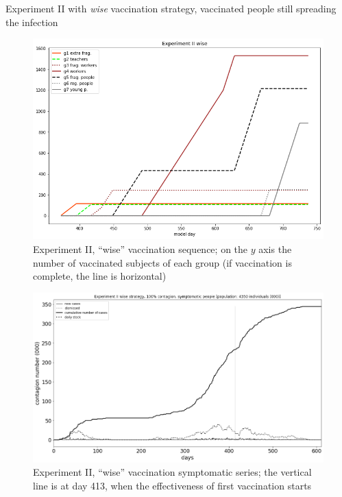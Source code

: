 \documentclass[8pt]{beamer}
\begin{document}
\begin{frame}{Experiment II with \emph{wise} vaccination strategy, vaccinated people still spreading the infection}

\begin{figure}[H]
\center
\includegraphics[scale=0.14]{Experiment_II_wiseVaccinationSequence.png} %

\caption{Experiment II, ``wise'' vaccination sequence; on the $y$ axis the number of vaccinated subjects of each group (if vaccination is complete, the line is horizontal)} 
\label{Experiment_II_wiseVaccinationSequence}
\end{figure}

\begin{figure}[H]
\center
\includegraphics[scale=0.16]{Experiment_II_1_wise_symptomatic_series.png} 

\caption{Experiment II, ``wise'' vaccination symptomatic series; the vertical line is at day 413, when the effectiveness of first vaccination starts} 
\label{Experiment_II_wiseSymptomaticSeries}
\end{figure}



\end{frame}
\end{document}

